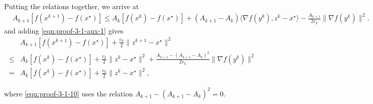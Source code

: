 Putting the relations together, we arrive at
\begin{align}
  & A_{k + 1} [f (x^{k + 1}) - f (x^{\star})]
  \leq  A_k [f (x^k) - f (x^{\star})] + (A_{k + 1} - A_k) \langle \nabla f
  (y^k), z^k - x^{\star} \rangle - \tfrac{A_{k + 1}}{2 v_k} \| \nabla f (y^k)
  \|^2 . \nonumber
\end{align}
and adding \eqref{eqn:proof-3-1-aux-1} gives
\begin{align}
  & A_{k + 1} [f (x^{k + 1}) - f (x^{\star})] + \tfrac{v_k}{2} \| z^{k + 1}
  - x^{\star} \|^2 \nonumber\\
  \leq{} & A_k [f (x^k) - f (x^{\star})] + \tfrac{v_k}{2} \| z^k - x^{\star}
  \|^2 + \tfrac{A_{k + 1} - (A_{k + 1} - A_k)^2}{2 v_k} \| \nabla f (y^k)
  \|^2 \nonumber\\
  ={} & A_k [f (x^k) - f (x^{\star})] + \tfrac{v_k}{2} \| z^k - x^{\star} \|^2, \label{eqn:proof-3-1-10}
\end{align}

where \eqref{eqn:proof-3-1-10} uses the relation $A_{k + 1} - (A_{k + 1} - A_k)^2 = 0 $.\\

